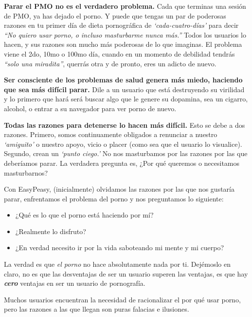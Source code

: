 \documentclass[
  spanish,
  openany]{book}
\providecommand{\tightlist}{%
  \setlength{\itemsep}{0pt}\setlength{\parskip}{0pt}}
\begin{document}
\textbf{Parar el PMO no es el verdadero problema.} Cada que terminas una sesión de PMO, ya has dejado el porno. Y puede que tengas un par de poderosas razones en tu primer día de dieta pornográfica de \emph{`cada-cuatro-días'} para decir \emph{``No quiero usar porno, o incluso masturbarme nunca más.''} Todos los usuarios lo hacen, y sus razones son mucho más poderosas de lo que imaginas. El problema viene el 2do, 10mo o 100mo día, cuando en un momento de debilidad tendrás \emph{``solo una miradita''}, querrás otra y de pronto, eres un adicto de nuevo.

\textbf{Ser consciente de los problemas de salud genera más miedo, haciendo que sea más difícil parar.} Dile a un usuario que está destruyendo su virilidad y lo primero que hará será buscar algo que le genere su dopamina, sea un cigarro, alcohol, o entrar a su navegador para ver porno de nuevo.

\textbf{Todas las razones para detenerse lo hacen más difícil.} Esto se debe a dos razones. Primero, somos continuamente obligados a renunciar a nuestro \emph{`amiguito'} o nuestro apoyo, vicio o placer (como sea que el usuario lo visualice). Segundo, crean un \emph{`punto ciego.'} No nos masturbamos por las razones por las que deberíamos parar. La verdadera pregunta es, ¿Por qué queremos o necesitamos masturbarnos?

Con EasyPeasy, (inicialmente) olvidamos las razones por las que nos gustaría parar, enfrentamos el problema del porno y nos preguntamos lo siguiente:

\begin{itemize}
\tightlist
\item
  ¿Qué es lo que el porno está haciendo por mí?
\item
  ¿Realmente lo disfruto?
\item
  ¿En verdad necesito ir por la vida saboteando mi mente y mi cuerpo?
\end{itemize}

La verdad es que \emph{el porno} no hace absolutamente nada por ti. Dejémoslo en claro, no es que las desventajas de ser un usuario superen las ventajas, es que hay \emph{\textbf{cero}} ventajas en ser un usuario de pornografía.

Muchos usuarios encuentran la necesidad de racionalizar el por qué usar porno, pero las razones a las que llegan son puras falacias e ilusiones.
\end{document}
